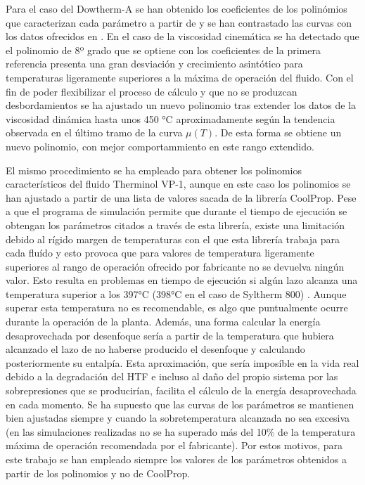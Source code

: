 \documentclass[11pt]{article}
\begin{document}
Para el caso del Dowtherm-A se han obtenido los coeficientes de los
polinómios que caracterizan cada parámetro a partir de
\cite{1022085/C5UIUT2V} y se han contrastado las curvas con los datos
ofrecidos en \cite{1022085/LB9BTEXK}. En el caso de la viscosidad
cinemática se ha detectado que el polinomio de 8º grado que se optiene
con los coeficientes de la primera referencia presenta una gran
desviación y crecimiento asintótico para temperaturas ligeramente
superiores a la máxima de operación del fluido. Con el fin de poder
flexibilizar el proceso de cálculo y que no se produzcan desbordamientos
se ha ajustado un nuevo polinomio tras extender los datos de la
viscosidad dinámica hasta unos 450 °C aproximadamente según la tendencia
observada en el último tramo de la curva \(\mu(T)\). De esta forma se
obtiene un nuevo polinomio, con mejor comportammiento en este rango
extendido.

El mismo procedimiento se ha empleado para obtener los polinomios
característicos del fluido Therminol VP-1, aunque en este caso los
polinomios se han ajustado a partir de una lista de valores sacada de la
librería CoolProp. Pese a que el programa de simulación permite que
durante el tiempo de ejecución se obtengan los parámetros citados a
través de esta librería, existe una limitación debido al rígido margen
de temperaturas con el que esta librería trabaja para cada fluído y esto
provoca que para valores de temperatura ligeramente superiores al rango
de operación ofrecido por fabricante no se devuelva ningún valor. Esto
resulta en problemas en tiempo de ejecución si algún lazo alcanza una
temperatura superior a los 397°C (398°C en el caso de Syltherm 800) .
Aunque superar esta temperatura no es recomendable, es algo que
puntualmente ocurre durante la operación de la planta. Además, una forma
calcular la energía desaprovechada por desenfoque sería a partir de la
temperatura que hubiera alcanzado el lazo de no haberse producido el
desenfoque y calculando posteriormente su entalpía. Esta aproximación,
que sería imposíble en la vida real debido a la degradación del HTF e
incluso al daño del propio sistema por las sobrepresiones que se
producirían, facilita el cálculo de la energía desaprovechada en cada
momento. Se ha supuesto que las curvas de los parámetros se mantienen
bien ajustadas siempre y cuando la sobretemperatura alcanzada no sea
excesiva (en las simulaciones realizadas no se ha superado más del 10\%
de la temperatura máxima de operación recomendada por el fabricante).
Por estos motivos, para este trabajo se han empleado siempre los valores
de los parámetros obtenidos a partir de los polinomios y no de CoolProp.
\end{document}
